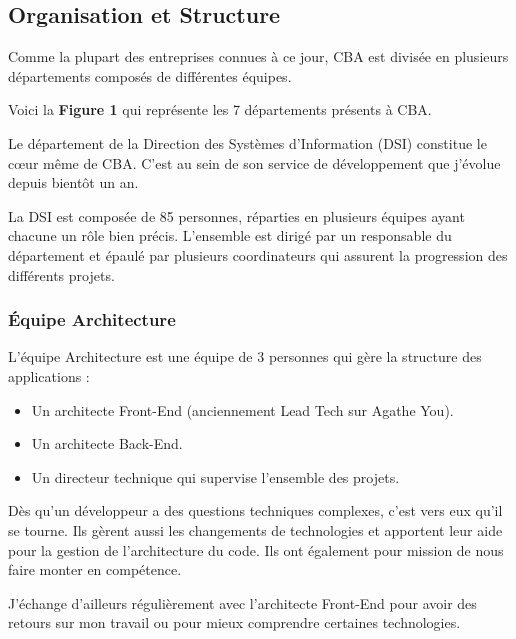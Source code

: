 \documentclass{article}
\begin{document}
\newpage

\subsection{Organisation et Structure}

Comme la plupart des entreprises connues à ce jour, CBA est divisée en plusieurs départements composés de différentes équipes.

Voici la \textbf{Figure 1} qui représente les 7 départements présents à CBA.


Le département de la Direction des Systèmes d'Information (DSI) constitue le cœur même de CBA. C'est au sein de son service de développement que j'évolue depuis bientôt un an.

La DSI est composée de 85 personnes, réparties en plusieurs équipes ayant chacune un rôle bien précis. L'ensemble est dirigé par un responsable du département et épaulé par plusieurs coordinateurs qui assurent la progression des différents projets.

\newpage

\subsubsection{Équipe Architecture}

L'équipe Architecture est une équipe de 3 personnes qui gère la structure des applications :

\begin{itemize}
    \item Un architecte Front-End (anciennement Lead Tech sur Agathe You).
    \item Un architecte Back-End.
    \item Un directeur technique qui supervise l'ensemble des projets.
\end{itemize}

Dès qu'un développeur a des questions techniques complexes, c'est vers eux qu'il se tourne. Ils gèrent aussi les changements de technologies et apportent leur aide pour la gestion de l'architecture du code. Ils ont également pour mission de nous faire monter en compétence.

J'échange d'ailleurs régulièrement avec l'architecte Front-End pour avoir des retours sur mon travail ou pour mieux comprendre certaines technologies.
\end{document}
